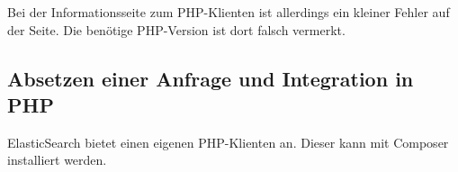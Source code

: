 Bei der Informationsseite zum PHP-Klienten ist allerdings ein kleiner Fehler auf der Seite. Die benötige PHP-Version ist dort falsch vermerkt.



\subsection{Absetzen einer Anfrage und Integration in PHP}

ElasticSearch bietet einen eigenen PHP-Klienten an. Dieser kann mit Composer installiert werden.


